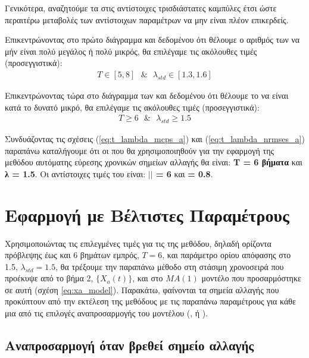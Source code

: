 \par Γενικότερα, αναζητούμε τα  στις αντίστοιχες τρισδιάστατες καμπύλες έτσι ώστε περαιτέρω μεταβολές των αντίστοιχων παραμέτρων να μην είναι πλέον επικερδείς.

\par Επικεντρώνοντας στο πρώτο διάγραμμα και δεδομένου ότι θέλουμε ο αριθμός των  να μήν είναι πολύ μεγάλος ή πολύ μικρός, θα επιλέγαμε τις ακόλουθες τιμές (προσεγγιστικά):
\begin{align}
    T \in [5,8] \ \ \ \& \ \ \ \lambda_{std} \in [1.3, 1.6]
    \label{eq:t_lambda_mcps_a}
\end{align}

\par Επικεντρώνοντας τώρα στο διάγραμμα των  και δεδομένου ότι θέλουμε το  να είναι κατά το δυνατό μικρό, θα επιλέγαμε τις ακόλουθες τιμές (προσεγγιστικά):
\begin{align}
    T \geq 6 \ \ \ \& \ \ \ \lambda_{std} \geq 1.5
    \label{eq:t_lambda_nrmses_a}
\end{align}

\par Συνδυάζοντας τις σχέσεις (\ref{eq:t_lambda_mcps_a}) και (\ref{eq:t_lambda_nrmses_a}) παραπάνω καταλήγουμε ότι οι  που θα χρησιμοποιηθούν για την εφαρμογή της μεθόδου αυτόματης εύρεσης χρονικών σημείων αλλαγής θα είναι:
\textbf{T = 6 βήματα} και \textbf{λ\textsubscript{} = 1.5}. Οι αντίστοιχες τιμές του  είναι: \textbf{$\vert$$\vert$ = 6 } και \textbf{ = 0.8}.


\section{Εφαρμογή με Βέλτιστες Παραμέτρους}

Χρησιμοποιώντας τις επιλεγμένες τιμές για τις  της μεθόδου, δηλαδή ορίζοντα πρόβλεψης έως και 6 βημάτων εμπρός, $T=6$, και παράμετρο ορίου απόφασης στο 1.5, $\lambda_{std}=1.5$, θα τρέξουμε την παραπάνω μέθοδο στη στάσιμη χρονοσειρά που προέκυψε από το βήμα 2, $\{X_a(t)\}$, και στο $MA(1)$ μοντέλο που προσαρμόστηκε σε αυτή (σχέση \ref{eq:xa_model}). Παρακάτω, φαίνονται τα σημεία αλλαγής που προκύπτουν από την εκτέλεση της μεθόδους με τις παραπάνω παραμέτρους για κάθε μια από τις επιλογές αναπροσαρμογής του μοντέλου (,  ή ).

\subsection{Αναπροσαρμογή όταν βρεθεί σημείο αλλαγής}

